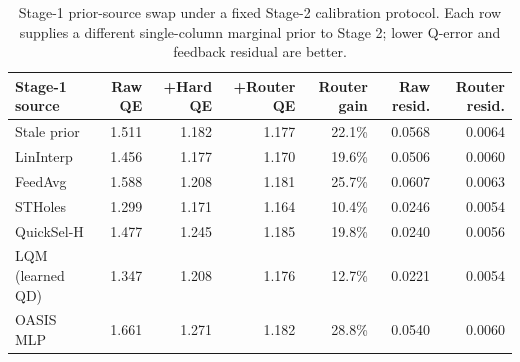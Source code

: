 \begin{table}[t]
  \centering
  \small
  \caption{Stage-1 prior-source swap under a fixed Stage-2 calibration protocol. Each row supplies a different single-column marginal prior to Stage 2; lower Q-error and feedback residual are better.}
  \label{tab:stage1_estimator_swap}
  \setlength{\tabcolsep}{4pt}
  \begin{tabular}{lrrrrrr}
    \toprule
    Stage-1 source & Raw QE & +Hard QE & +Router QE & Router gain & Raw resid. & Router resid. \\
    \midrule
    Stale prior & 1.511 & 1.182 & 1.177 & 22.1\% & 0.0568 & 0.0064 \\
    LinInterp & 1.456 & 1.177 & 1.170 & 19.6\% & 0.0506 & 0.0060 \\
    FeedAvg & 1.588 & 1.208 & 1.181 & 25.7\% & 0.0607 & 0.0063 \\
    STHoles & 1.299 & 1.171 & 1.164 & 10.4\% & 0.0246 & 0.0054 \\
    QuickSel-H & 1.477 & 1.245 & 1.185 & 19.8\% & 0.0240 & 0.0056 \\
    LQM (learned QD) & 1.347 & 1.208 & 1.176 & 12.7\% & 0.0221 & 0.0054 \\
    OASIS MLP & 1.661 & 1.271 & 1.182 & 28.8\% & 0.0540 & 0.0060 \\
    \bottomrule
  \end{tabular}
\end{table}

